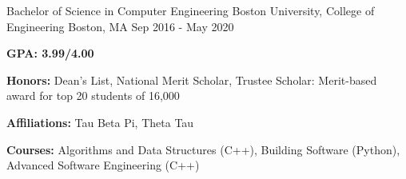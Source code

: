 



\begin{cventries}


\cventry
{Bachelor of Science in Computer Engineering} %
{Boston University, College of Engineering} %
{Boston, MA} %
{Sep 2016 - May 2020} %
{ %
\begin{cvitems}
\item {\textcolor{dark-grey}{\textbf{GPA: 3.99/4.00}}}
\item {\textcolor{dark-grey}{\textbf{Honors:}} Dean’s List, National Merit Scholar, Trustee Scholar: Merit-based award for top 20 students of 16,000}
\item {\textcolor{dark-grey}{\textbf{Affiliations:}} Tau Beta Pi, Theta Tau}
\item {\textcolor{dark-grey}{\textbf{Courses:}} Algorithms and Data Structures (C++), Building Software (Python), Advanced Software Engineering (C++)}
\end{cvitems}
}


\end{cventries}